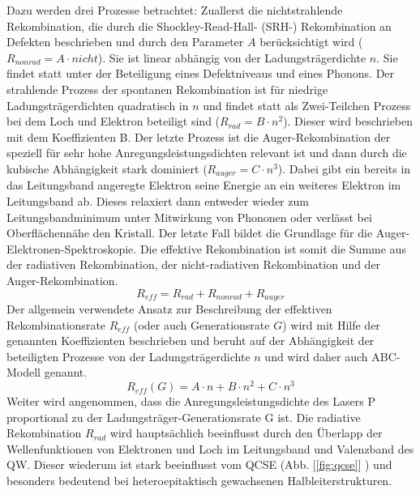 \raggedright
%
Dazu werden drei Prozesse betrachtet: Zuallerst die nichtstrahlende Rekombination, die durch die Shockley-Read-Hall- (SRH-) Rekombination an Defekten beschrieben und durch den Parameter $A$ berücksichtigt wird ($R_{nonrad} = A \cdot nicht $). Sie ist linear abhängig von der Ladungsträgerdichte $n$. Sie findet statt unter der Beteiligung eines Defektniveaus und eines Phonons. Der strahlende Prozess der spontanen Rekombination ist für niedrige Ladungsträgerdichten quadratisch in $n$ und findet statt als Zwei-Teilchen Prozess bei dem Loch und Elektron beteiligt sind ($R_{rad} = B \cdot n^2 $). Dieser wird beschrieben mit dem Koeffizienten B. 
Der letzte Prozess ist die Auger-Rekombination der speziell für sehr hohe Anregungsleistungsdichten relevant ist und dann durch die kubische Abhängigkeit stark dominiert ($R_{auger} = C \cdot n^3 $). Dabei gibt ein bereits in das Leitungsband angeregte Elektron seine Energie an ein weiteres Elektron im Leitungsband ab. Dieses relaxiert dann entweder wieder zum Leitungsbandminimum unter Mitwirkung von Phononen oder verlässt bei Oberflächennähe den Kristall. Der letzte Fall bildet die Grundlage für die Auger-Elektronen-Spektroskopie.
Die effektive Rekombination ist somit die Summe aus der radiativen Rekombination, der nicht-radiativen Rekombination und der Auger-Rekombination.
\begin{equation}
    R_{eff} = R_{rad} + R_{nonrad} + R_{auger}
    \label{eq:iqe1}
\end{equation}
Der allgemein verwendete Ansatz zur Beschreibung der effektiven Rekombinationsrate $R_{eff}$ (oder auch Generationsrate $G$) wird mit Hilfe der genannten Koeffizienten beschrieben und beruht auf der Abhängigkeit der beteiligten Prozesse von der Ladungsträgerdichte $n$ und wird daher auch ABC-Modell genannt.
\begin{equation}
    R_{eff} (G) = A \cdot n + B \cdot n^2 + C \cdot n^3 
    \label{eq:iqe2}
\end{equation}
Weiter wird angenommen, dass die Anregungsleistungsdichte des Lasers P proportional zu
der Ladungsträger-Generationsrate G ist. Die radiative Rekombination $R_{rad}$ wird hauptsächlich beeinflusst durch den Überlapp der Wellenfunktionen von Elektronen und Loch im Leitungsband und Valenzband des QW. Dieser wiederum ist stark beeinflusst vom QCSE (Abb. 
[\ref{fig:qcse}] ) und besonders bedeutend bei heteroepitaktisch gewachsenen Halbleiterstrukturen. 
%
